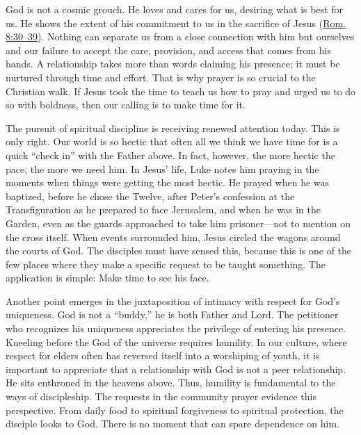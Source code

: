 			God is not a cosmic grouch. He loves and cares for us, desiring what is best for us. He shows the extent of his commitment to us in the sacrifice of Jesus (\hyperref[ROMANS-8-30]{Rom. 8:30--39}). Nothing can separate us from a close connection with him but ourselves and our failure to accept the care, provision, and access that comes from his hands. A relationship takes more than words claiming his presence; it must be nurtured through time and effort. That is why prayer is so crucial to the Christian walk. If Jesus took the time to teach us how to pray and urged us to do so with boldness, then our calling is to make time for it. 

			The pursuit of spiritual discipline is receiving renewed attention today. This is only right. Our world is so hectic that often all we think we have time for is a quick ``check in'' with the Father above. In fact, however, the more hectic the pace, the more we need him. In Jesus' life, Luke notes him praying in the moments when things were getting the most hectic. He prayed when he was baptized, before he chose the Twelve, after Peter's confession at the Transfiguration as he prepared to face Jerusalem, and when he was in the Garden, even as the guards approached to take him prisoner---not to mention on the cross itself. When events surrounded him, Jesus circled the wagons around the courts of God. The disciples must have sensed this, because this is one of the few places where they make a specific request to be taught something. The application is simple: Make time to see his face. 

			Another point emerges in the juxtaposition of intimacy with respect for God's uniqueness. God is not a ``buddy,'' he is both Father and Lord. The petitioner who recognizes his uniqueness appreciates the privilege of entering his presence. Kneeling before the God of the universe requires humility. In our culture, where respect for elders often has reversed itself into a worshiping of youth, it is important to appreciate that a relationship with God is not a peer relationship. He sits enthroned in the heavens above. Thus, humility is fundamental to the ways of discipleship. The requests in the community prayer evidence this perspective. From daily food to spiritual forgiveness to spiritual protection, the disciple looks to God. There is no moment that can spare dependence on him. 


